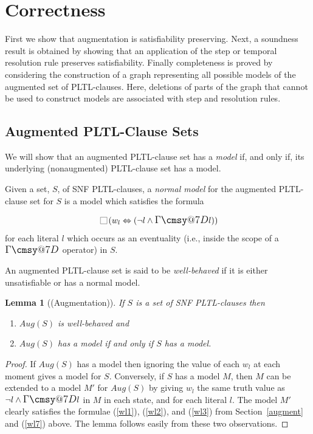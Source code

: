 \documentclass[nohyperref]{acmtrans2f}
\makeatletter
\def\sometime{\mathord{\hbox{\large$\mathchar"0\cmsy@7D$}}}
\newcommand{\always}{\raisebox{-.2ex}{
                           \mbox{\unitlength=0.9ex
                           \begin{picture}(2,2)
                           \linethickness{0.06ex}
                           \put(0,0){\line(1,0){2}}
                           \put(0,2){\line(1,0){2}}
                           \put(0,0){\line(0,1){2}}
                           \put(2,0){\line(0,1){2}}
                           \end{picture}}}
                          \,}
\let\iff=\Leftrightarrow
\newtheorem{sublemma}{Lemma}[subsection]
\makeatother
\begin{document}
\section{Correctness}
\label{sec.correct}
First we show that augmentation is satisfiability preserving. Next, a
soundness result is obtained by showing that an application of the step or
temporal resolution rule preserves satisfiability. Finally completeness is
proved by considering the construction of a graph representing all possible
models of the augmented set of PLTL-clauses. Here, deletions of parts of the
graph that cannot be used to construct models are associated with step and
resolution rules. 
%

\subsection{Augmented PLTL-Clause Sets}
\label{mod.rulesets}
%

\noindent We will show that an augmented PLTL-clause set has a {\em
model\/} if, and only if, its underlying (nonaugmented) PLTL-clause set has
a model. 

\begin{subdefn}
Given a set, $S$, of SNF PLTL-clauses, a {\em
normal model} for the augmented PLTL-clause set for $S$ is a model which
satisfies the formula
\end{subdefn}
%
\begin{equation}
\always (w_l \iff  (\neg l \land \sometime l)) \label{wl7}
\end{equation}
for each literal $l$ which occurs as an eventuality (i.e., inside the scope
of a $\sometime$ operator) in $S$. 

\begin{subdefn} An augmented PLTL-clause set is said to be {\em well-behaved\/}
if it is either unsatisfiable or has a normal model.
\end{subdefn}


\begin{sublemma}[(Augmentation)]
\label{wellbehaved}
If $S$ is a set of SNF PLTL-clauses then
\begin{enumerate}
\item $Aug(S)$ is well-behaved and
\item $Aug(S)$ has a model if and only if $S$ has a model.
\end{enumerate}
\end{sublemma}
\begin{proof}
%
If $Aug(S)$ has a model then ignoring the value of each $w_l$ at each
moment gives a model for $S$. Conversely, if $S$ has a model $M$, then
$M$ can be extended to a model $M'$ for $Aug(S)$ by giving $w_l$ the
same truth value as $\neg l \land \sometime l$ in $M$ in each state, and for each
literal $l$. The model $M'$ clearly satisfies the formulae (\ref{wl1}),
(\ref{wl2}), and (\ref{wl3}) from Section~\ref{augment} and (\ref{wl7}) above. The
lemma follows easily from these two observations.
\end{proof}
\end{document}
